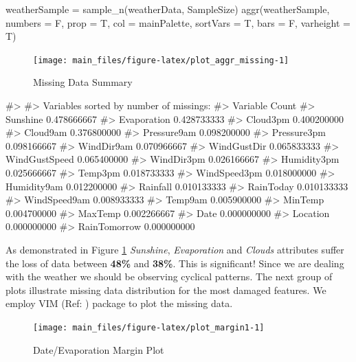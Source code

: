 \begin{Schunk}
\begin{Sinput}
weatherSample = sample_n(weatherData, SampleSize)
aggr(weatherSample, numbers = F, prop = T, col = mainPalette, sortVars = T, bars = F, varheight = T)
\end{Sinput}
\begin{figure}[H]

{\centering \texttt{[image: main\_files/figure-latex/plot\_aggr\_missing-1]} 

}

\caption[Missing Data Summary]{Missing Data Summary}\label{fig:plot_aggr_missing}
\end{figure}
\begin{Soutput}
#> 
#>  Variables sorted by number of missings: 
#>       Variable       Count
#>       Sunshine 0.478666667
#>    Evaporation 0.428733333
#>       Cloud3pm 0.400200000
#>       Cloud9am 0.376800000
#>    Pressure9am 0.098200000
#>    Pressure3pm 0.098166667
#>     WindDir9am 0.070966667
#>    WindGustDir 0.065833333
#>  WindGustSpeed 0.065400000
#>     WindDir3pm 0.026166667
#>    Humidity3pm 0.025666667
#>        Temp3pm 0.018733333
#>   WindSpeed3pm 0.018000000
#>    Humidity9am 0.012200000
#>       Rainfall 0.010133333
#>      RainToday 0.010133333
#>   WindSpeed9am 0.008933333
#>        Temp9am 0.005900000
#>        MinTemp 0.004700000
#>        MaxTemp 0.002266667
#>           Date 0.000000000
#>       Location 0.000000000
#>   RainTomorrow 0.000000000
\end{Soutput}
\end{Schunk}

As demonstrated in Figure \ref{fig:plot_aggr_missing} \emph{Sunshine},
\emph{Evaporation} and \emph{Clouds} attributes suffer the loss of data
between \textbf{48\%} and \textbf{38\%}. This is significant! Since we
are dealing with the weather we should be observing cyclical patterns.
The next group of plots illustrate missing data distribution for the
most damaged features. We employ VIM (Ref: \cite{vim}) package to plot
the missing data.

\begin{Schunk}
\begin{figure}[H]

{\centering \texttt{[image: main\_files/figure-latex/plot\_margin1-1]} 

}

\caption[Date/Evaporation Margin Plot]{Date/Evaporation Margin Plot}\label{fig:plot_margin1}
\end{figure}
\end{Schunk}

